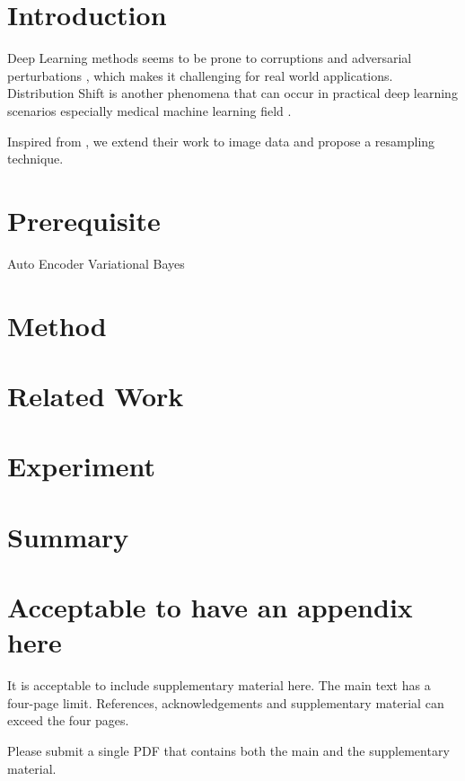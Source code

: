 \documentclass{article}
\begin{document}
\section{Introduction}
\label{intro}
Deep Learning methods seems to be prone to corruptions and adversarial perturbations \cite{carlini2017towards}, which makes it challenging for real world applications. Distribution Shift \cite{wen2014robust} is another phenomena that can occur in practical deep learning scenarios especially medical machine learning field \cite{sun2019high}. 

Inspired from \cite{sun2019high}, we extend their work to image data and propose a resampling technique.

\section{Prerequisite}
Auto Encoder Variational Bayes\,
\section{Method}
\section{Related Work}
\section{Experiment}
\section{Summary}




\appendix
\section{Acceptable to have an appendix here}
It is acceptable to include supplementary material here. 
The main text has a four-page limit. References, acknowledgements and supplementary material can exceed the four pages. 

Please submit a single PDF that contains both the main and the supplementary material. 
\end{document}
